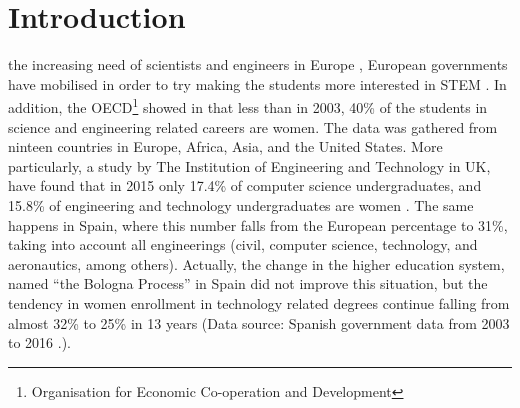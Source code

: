 \documentclass[journal,transmag]{IEEEtran}
\begin{document}
\IEEEdisplaynontitleabstractindextext







%
\IEEEpeerreviewmaketitle

\section{Introduction}
\label{sec:intro}

 the increasing need of scientists and engineers in Europe \cite{gago2004europe}, European governments have mobilised in order to try making the students more interested in STEM \cite{Kearney2014}. In addition, the OECD\footnote{Organisation for Economic Co-operation and Development} showed in \cite{OECD2006} that less than in 2003, 40\% of the students in science and engineering related careers are women. The data was gathered from ninteen countries in Europe, Africa, Asia, and the United States. More particularly, a study by The Institution of Engineering and Technology in UK, have found that in 2015 only 17.4\% of computer science undergraduates, and 15.8\% of engineering and technology undergraduates are women \cite{IET::stats}. The same happens in Spain, where this number falls from the European percentage to 31\%, taking into account all engineerings (civil, computer science, technology, and aeronautics, among others). Actually, the change in the higher education system, named ``the Bologna Process'' in Spain \cite{wagenaar2008universities} did not improve this situation, but the tendency in women enrollment in technology related degrees continue falling from almost 32\% to 25\% in 13 years (Data source: Spanish government data from 2003 to 2016 \cite{datos::uni}.).
\end{document}
